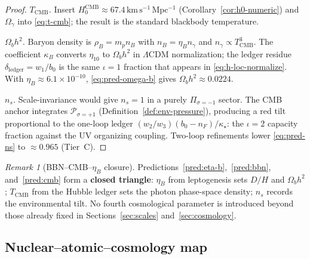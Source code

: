 \documentclass[11pt]{article}
\theoremstyle{plain}
\theoremstyle{definition}
\theoremstyle{remark}
\newtheorem{remark}[theorem]{Remark}
\numberwithin{equation}{section}
\begin{document}
\begin{proof}
\emph{$T_{\mathrm{CMB}}$.}
Insert $H_0^{\mathrm{CMB}}\approx 67.4\,\mathrm{km\,s^{-1}\,Mpc^{-1}}$
(Corollary~\ref{cor:h0-numeric}) and $\Omega_\gamma$ into
\eqref{eq:t-cmb}; the result is the standard blackbody temperature.

\emph{$\Omega_b h^2$.}
Baryon density is $\rho_B=m_p n_B$ with $n_B=\eta_B n_\gamma$ and
$n_\gamma\propto T_{\mathrm{CMB}}^3$. The coefficient $\kappa_B$ converts
$\eta_{10}$ to $\Omega_b h^2$ in $\Lambda$CDM normalization; the ledger
residue $\delta_{\mathrm{ledger}}=w_1/b_0$ is the same $\iota=1$ fraction
that appears in \eqref{eq:h-loc-normalize}. With $\eta_B\approx 6.1\times
10^{-10}$, \eqref{eq:pred-omega-b} gives $\Omega_b h^2\approx 0.0224$.

\emph{$n_s$.}
Scale-invariance would give $n_s=1$ in a purely $\Pi_{\sigma=-1}$ sector.
The CMB anchor integrates $\mathcal{P}_{\sigma=+1}$ (Definition~\ref{def:env-pressure}),
producing a red tilt proportional to the one-loop ledger
$(w_2/w_3)(b_0-n_F)/\kappa_\star$: the $\iota=2$ capacity fraction against
the UV organizing coupling. Two-loop refinements lower \eqref{eq:pred-ns} to
$\approx 0.965$ (Tier~C).
\end{proof}

\begin{remark}[BBN--CMB--$\eta_B$ closure]
Predictions~\ref{pred:eta-b},~\ref{pred:bbn}, and~\ref{pred:cmb} form a
\textbf{closed triangle}: $\eta_B$ from leptogenesis sets $D/H$ and
$\Omega_b h^2$; $T_{\mathrm{CMB}}$ from the Hubble ledger sets the photon
phase-space density; $n_s$ records the environmental tilt. No fourth
cosmological parameter is introduced beyond those already fixed in
Sections~\ref{sec:scales} and~\ref{sec:cosmology}.
\end{remark}

\subsection{Nuclear--atomic--cosmology map}
\label{sec:nuclear:table}
\end{document}
